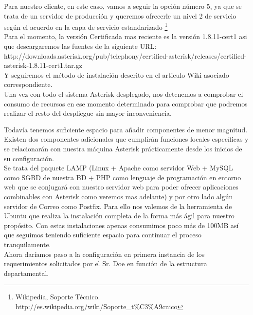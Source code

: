 Para nuestro cliente, en este caso, vamos a seguir la opción número 5, ya que se trata de un servidor de producción y queremos ofrecerle un nivel 2 de servicio según el acuerdo en la capa de servicio estandarizado \footnote{Wikipedia, Soporte Técnico. http://es.wikipedia.org/wiki/Soporte\_t\%C3\%A9cnico}\\

Para el momento, la versión Certificada mas reciente es la versión 1.8.11-cert1 asi que descargaremos las fuentes de la siguiente URL:\\

http://downloads.asterisk.org/pub/telephony/certified-asterisk/releases/certified-asterisk-1.8.11-cert1.tar.gz\\

Y seguiremos el método de instalación descrito en el articulo Wiki asociado correspondiente.\\

Una vez con todo el sistema Asterisk desplegado, nos detenemos a comprobar el consumo de recursos en ese momento determinado para comprobar que podremos realizar el resto del despliegue sin mayor inconveniencia.\\


Todavía tenemos suficiente espacio para añadir componentes de menor magnitud. Existen dos componentes adicionales que cumplirán funciones locales específicas y se relacionarán con nuestra máquina Asterisk prácticamente desde los inicios de su configuración. \\

Se trata del paquete LAMP (Linux + Apache como servidor Web + MySQL como SGBD de nuestra BD + PHP como lenguaje de programación en entorno web que se conjugará con nuestro servidor web para poder ofrecer aplicaciones combinables con Asterisk como veremos mas adelante) y por otro lado algún servidor de Correo como Postfix. Para ello nos valemos de la herramienta  de Ubuntu que realiza la instalación completa de la forma más ágil para nuestro propósito. Con estas instalaciones apenas consumimos poco más de 100MB así que seguimos teniendo suficiente espacio para continuar el proceso tranquilamente.\\

Ahora daríamos paso a la configuración en primera instancia de los requerimientos solicitados por el Sr. Doe en función de la estructura departamental.\\

